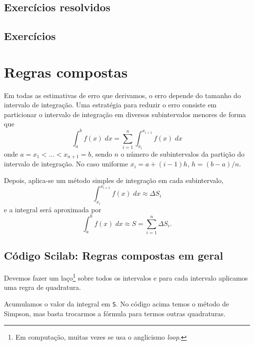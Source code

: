 \subsection*{Exercícios resolvidos}

\construirExeresol

\subsection*{Exercícios}

\construirExer

\section{Regras compostas}

Em todas as estimativas de erro que derivamos, o erro depende do tamanho do intervalo de integração. Uma estratégia para reduzir o erro consiste em particionar o intervalo de integração em diversos subintervalos menores de forma que
\begin{equation}
\int_{a}^b f(x)\;dx=\sum_{i=1}^{n} \int_{x_i}^{x_{i+1}} f(x)\;dx
\end{equation}
onde $a=x_1<...<x_{n+1}=b$, sendo $n$ o número de subintervalos da partição do intervalo de integração. No caso uniforme $x_i = a + (i-1)h$, $h = (b-a)/n$.

Depois, aplica-se um método simples de integração em cada subintervalo,
\begin{equation}
\int_{x_i}^{x_{i+1}} f(x)\;dx \approx \Delta S_i
\end{equation}
e a integral será aproximada por
\begin{equation}
\int_a^b f(x)\;dx \approx S= \sum_{i=1}^{n} \Delta S_i.
\end{equation}

\ifisscilab
\subsection{Código Scilab: Regras compostas em geral}
Devemos fazer um laço\footnote{Em computação, muitas vezes se usa o anglicismo {\it loop}.} sobre todos os intervalos e para cada intervalo aplicamos uma regra de quadratura.



Acumulamos o valor da integral em \verb+S+. No código acima temos o método de Simpson, mas basta trocarmos a fórmula para termos outras quadraturas.


